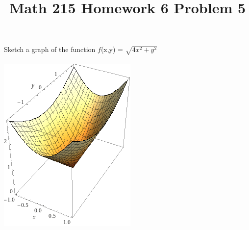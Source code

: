 \documentclass{article} %
\title{Math 215 Homework 6 Problem 5} %
\author{} %
\date{} %
\begin{document}
    \maketitle
    Sketch a graph of the function $f$(x,y) = $\sqrt{4x^2+y^2}$\\\\
    \includegraphics{image.png}
\end{document}
